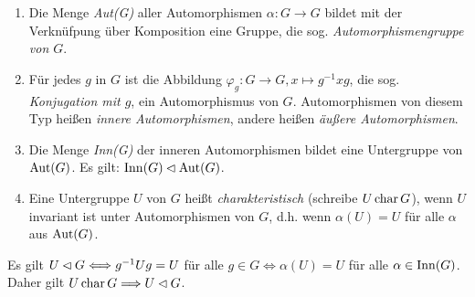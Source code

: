 \begin{defundsatz}\label{1.2}\label{schabrackentapir}\spspace
{}
 \begin{enumerate}
 \item Die Menge \emph{Aut(G)} aller Automorphismen $\alpha : G \to G$ bildet mit der Verkn\"ufpung \"uber Komposition eine Gruppe, die sog. \emph{Automorphismengruppe von $G$}.
 \item F\"ur jedes $g$ in $G$ ist die Abbildung $\varphi_g : G \to G, x \mapsto g^{-1}xg$, die sog. \emph{Konjugation mit $g$}, ein Automorphismus von $G$. Automorphismen von diesem Typ hei\ss{}en \emph{innere Automorphismen}, andere hei\ss{}en \emph{\"au\ss{}ere Automorphismen}.
\item Die Menge \emph{Inn(G)} der inneren Automorphismen bildet eine Untergruppe von $\operatorname{Aut}(G)$. Es gilt: $\operatorname{Inn}(G) \lhd \operatorname{Aut}(G)$.
\item Eine Untergruppe $U$ von $G$ hei\ss{}t \emph{charakteristisch} (schreibe $U \operatorname{char} G$), wenn $U$ invariant ist unter Automorphismen von $G$, d.h. wenn $\alpha(U)=U$ f\"ur alle $\alpha$ aus $\operatorname{Aut}(G)$.
\end{enumerate}

\end{defundsatz}

\begin{bemerkung*}
 Es gilt $U\lhd G \Longleftrightarrow g^{-1}Ug = U$ f\"ur alle $g\in G \Longleftrightarrow \alpha(U)=U$ f\"ur alle $\alpha \in \operatorname{Inn}(G)$. Daher gilt $U\operatorname{char} G \Longrightarrow U \lhd G$.
\end{bemerkung*}





